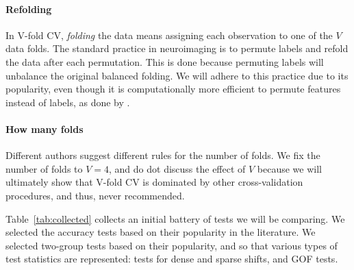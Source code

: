 \documentclass[]{bio}
\begin{document}
\paragraph{Refolding}
In V-fold CV, \emph{folding} the data means assigning each observation to one of the $V$ data folds. 
The standard practice in neuroimaging is to permute labels and refold the data after each permutation. 
This is done because permuting labels will unbalance the original balanced folding.
We will adhere to this practice due to its popularity, even though it is computationally more efficient to permute features instead of labels, as done by \cite{golland_permutation_2005}.


\paragraph{How many folds}
Different authors suggest different rules for the number of folds. 
We fix the number of folds to $V=4$, and do dot discuss the effect of $V$ because we will ultimately show that V-fold CV is dominated by other cross-validation procedures, and thus, never recommended. 

\bigskip

Table~\ref{tab:collected} collects an initial battery of tests we will be comparing. 
We selected the accuracy tests based on their popularity in the literature.
We selected two-group tests based on their popularity, and so that various types of test statistics are represented: tests for dense and sparse shifts, and GOF tests. 
\end{document}
